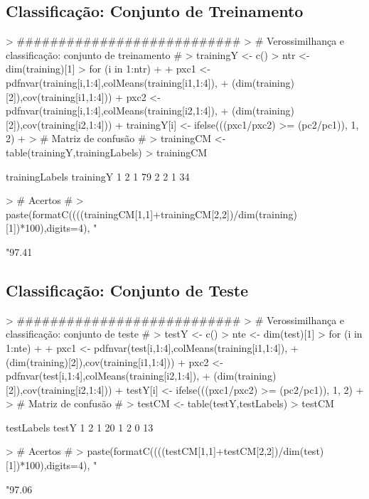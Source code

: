 \documentclass{article}
\begin{document}
\subsection{Classificação: Conjunto de Treinamento}
\begin{Schunk}
\begin{Sinput}
> ###########################
> # Verossimilhança e classificação: conjunto de treinamento #
> trainingY <- c()
> ntr <- dim(training)[1]
> for (i in 1:ntr)
+ {
+   pxc1 <- pdfnvar(training[i,1:4],colMeans(training[i1,1:4]),
+                   (dim(training)[2]),cov(training[i1,1:4]))
+   pxc2 <- pdfnvar(training[i,1:4],colMeans(training[i2,1:4]),
+                   (dim(training)[2]),cov(training[i2,1:4]))
+   trainingY[i] <- ifelse(((pxc1/pxc2) >= (pc2/pc1)), 1, 2)
+ }
> # Matriz de confusão #
> trainingCM <- table(trainingY,trainingLabels)
> trainingCM
\end{Sinput}
\begin{Soutput}
         trainingLabels
trainingY  1  2
        1 79  2
        2  1 34
\end{Soutput}
\begin{Sinput}
> # Acertos #
> paste(formatC((((trainingCM[1,1]+trainingCM[2,2])/dim(training)[1])*100),digits=4), "%
\end{Sinput}
\begin{Soutput}
[1] "97.41%
\end{Soutput}
\end{Schunk}

\subsection{Classificação: Conjunto de Teste}
\begin{Schunk}
\begin{Sinput}
> ###########################
> # Verossimilhança e classificação: conjunto de teste #
> testY <- c()
> nte <- dim(test)[1]
> for (i in 1:nte)
+ {
+   pxc1 <- pdfnvar(test[i,1:4],colMeans(training[i1,1:4]),
+                   (dim(training)[2]),cov(training[i1,1:4]))
+   pxc2 <- pdfnvar(test[i,1:4],colMeans(training[i2,1:4]),
+                   (dim(training)[2]),cov(training[i2,1:4]))
+   testY[i] <- ifelse(((pxc1/pxc2) >= (pc2/pc1)), 1, 2)
+ }
> # Matriz de confusão #
> testCM <- table(testY,testLabels)
> testCM
\end{Sinput}
\begin{Soutput}
     testLabels
testY  1  2
    1 20  1
    2  0 13
\end{Soutput}
\begin{Sinput}
> # Acertos #
> paste(formatC((((testCM[1,1]+testCM[2,2])/dim(test)[1])*100),digits=4), "%
\end{Sinput}
\begin{Soutput}
[1] "97.06%
\end{Soutput}
\end{Schunk}
\end{document}
